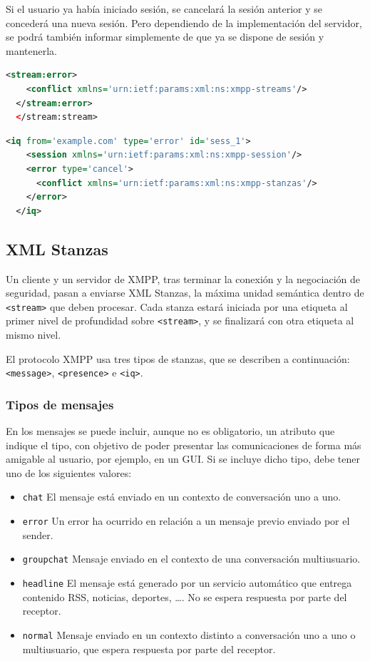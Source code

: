 \documentclass[a4paper, 11pt]{article} %
\begin{document}
      Si el usuario ya había iniciado sesión, se cancelará la sesión anterior y se concederá
      una nueva sesión. Pero dependiendo de la implementación del servidor, se podrá también informar
      simplemente de que ya se dispone de sesión y mantenerla.
      
  \begin{lstlisting}[language=XML]
  <stream:error>
    <conflict xmlns='urn:ietf:params:xml:ns:xmpp-streams'/>
  </stream:error>
  </stream:stream>
  \end{lstlisting}
  \begin{lstlisting}[language=XML]
  <iq from='example.com' type='error' id='sess_1'>
    <session xmlns='urn:ietf:params:xml:ns:xmpp-session'/>
    <error type='cancel'>
      <conflict xmlns='urn:ietf:params:xml:ns:xmpp-stanzas'/>
    </error>
  </iq>
  \end{lstlisting}  

  \subsection{XML Stanzas}
    Un cliente y un servidor de XMPP, tras terminar la conexión y la negociación de seguridad,
    pasan a enviarse XML Stanzas, la máxima unidad semántica dentro de \texttt{<stream>} que deben procesar.
    Cada stanza estará iniciada por una etiqueta al primer nivel de profundidad sobre \texttt{<stream>},
    y se finalizará con otra etiqueta al mismo nivel.
    
    El protocolo XMPP usa tres tipos de stanzas, que se describen a continuación: \texttt{<message>}, \texttt{<presence>}
    e \texttt{<iq>}.
  
    \subsubsection{Tipos de mensajes}
      En los mensajes se puede incluir, aunque no es obligatorio, un atributo que indique el tipo, con objetivo de poder
      presentar las comunicaciones de forma más amigable al usuario, por ejemplo, en un GUI. Si se incluye dicho tipo, debe
      tener uno de los siguientes valores:
      
      \begin{itemize}
	\item \texttt{chat} El mensaje está enviado en un contexto de conversación uno a uno.
	\item \texttt{error} Un error ha ocurrido en relación a un mensaje previo enviado por el sender.
	\item \texttt{groupchat} Mensaje enviado en el contexto de una conversación multiusuario.
	\item \texttt{headline} El mensaje está generado por un servicio automático que entrega contenido RSS, noticias, 
	  deportes, \ldots. No se espera respuesta por parte del receptor.
	\item \texttt{normal} Mensaje enviado en un contexto distinto a conversación uno a uno o multiusuario, que espera
	  respuesta por parte del receptor.
      \end{itemize}
      
\end{document}
